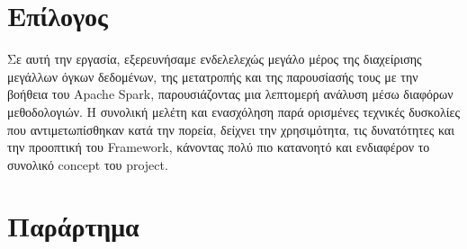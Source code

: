 \documentclass{article}
\begin{document}
\section{Επίλογος}
\label{sec:conclusion}
Σε αυτή την εργασία, εξερευνήσαμε ενδελελεχώς μεγάλο μέρος της διαχείρισης μεγάλλων όγκων δεδομένων, της μετατροπής και της παρουσίασής τους με την βοήθεια του Apache Spark, παρουσιάζοντας μια λεπτομερή ανάλυση μέσω διαφόρων μεθοδολογιών. Η συνολική μελέτη και ενασχόληση παρά ορισμένες τεχνικές δυσκολίες που αντιμετωπίσθηκαν κατά την πορεία, δείχνει την χρησιμότητα, τις δυνατότητες και την προοπτική του  Framework, κάνοντας πολύ πιο κατανοητό και ενδιαφέρον το συνολικό  concept  του  project.


\clearpage
{}
\section{Παράρτημα}
\label{sec:appendix}
\end{document}
